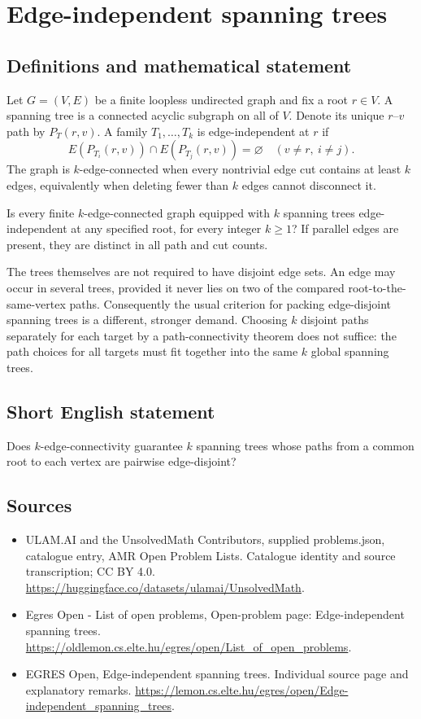 \documentclass[11pt,a4paper]{article}
\begin{document}
\section*{Edge-independent spanning trees}\label{statement}

\subsection{Definitions and mathematical statement}
Let $G=(V,E)$ be a finite loopless undirected graph and fix a root
$r\in V$. A spanning tree is a connected acyclic subgraph on all of
$V$. Denote its unique $r$--$v$ path by $P_T(r,v)$.
A family $T_1,\ldots,T_k$ is edge-independent at $r$ if
\[
 E(P_{T_i}(r,v))\cap E(P_{T_j}(r,v))=\varnothing
                 \quad(v\ne r,\ i\ne j).
\]
The graph is $k$-edge-connected when every nontrivial edge cut contains
at least $k$ edges, equivalently when deleting fewer than $k$ edges
cannot disconnect it.

Is every finite $k$-edge-connected graph equipped with $k$ spanning
trees edge-independent at any specified root, for every integer $k\ge1$?
If parallel edges are present, they are distinct in all path and cut
counts.

The trees themselves are not required to have disjoint edge sets.
An edge may occur in several trees, provided it never lies on two
of the compared root-to-the-same-vertex paths. Consequently the usual
criterion for packing edge-disjoint spanning trees is a different,
stronger demand. Choosing $k$ disjoint paths separately for each target
by a path-connectivity theorem does not suffice: the path choices for
all targets must fit together into the same $k$ global spanning trees.
\subsection{Short English statement}
Does $k$-edge-connectivity guarantee $k$ spanning trees whose
paths from a common root to each vertex are pairwise edge-disjoint?
\subsection{Sources}
\begin{itemize}
\item[S1] ULAM.AI and the UnsolvedMath Contributors, supplied problems.json, catalogue entry, AMR Open Problem Lists. Catalogue identity and source transcription; CC BY 4.0.
\url{https://huggingface.co/datasets/ulamai/UnsolvedMath}.
\item[S2] Egres Open - List of open problems, Open-problem page: Edge-independent spanning trees. 
\url{https://oldlemon.cs.elte.hu/egres/open/List_of_open_problems}.
\item[S3] EGRES Open, Edge-independent spanning trees. Individual source page and explanatory remarks.
\url{https://lemon.cs.elte.hu/egres/open/Edge-independent_spanning_trees}.
\end{itemize}
\end{document}
